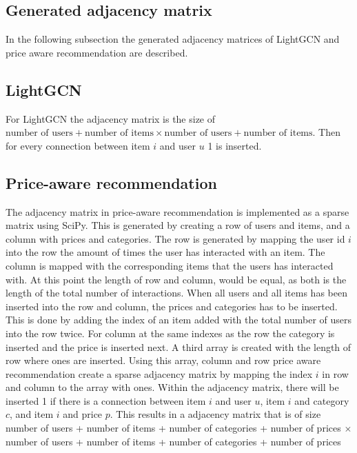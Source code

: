 \subsection{Generated adjacency matrix}
In the following subsection the generated adjacency matrices of LightGCN and price aware recommendation are described.

\subsection{LightGCN}
For LightGCN the adjacency matrix is the size of $\textrm{number of users} + \textrm{number of items} \times \textrm{number of users} + \textrm{number of items}$.
Then for every connection between item $i$ and user $u$ 1 is inserted.

\subsection{Price-aware recommendation}
The adjacency matrix in price-aware recommendation is implemented as a sparse matrix using SciPy.
This is generated by creating a row of users and items, and a column with prices and categories.
The row is generated by mapping the user id $i$ into the row the amount of times the user has interacted with an item.
The column is mapped with the corresponding items that the users has interacted with.
At this point the length of row and column, would be equal, as both is the length of the total number of interactions.
When all users and all items has been inserted into the row and column, the prices and categories has to be inserted.
This is done by adding the index of an item added with the total number of users into the row twice.
For column at the same indexes as the row the category is inserted and the price is inserted next.
A third array is created with the length of row where ones are inserted.
Using this array, column and row price aware recommendation create a sparse adjacency matrix by mapping the index $i$ in row and column to the array with ones.
Within the adjacency matrix, there will be inserted 1 if there is a connection between item $i$ and user $u$, item $i$ and category $c$, and item $i$ and price $p$.
This results in a adjacency matrix that is of size number of users + number of items + number of categories + number of prices $\times$ number of users + number of items + number of categories + number of prices
